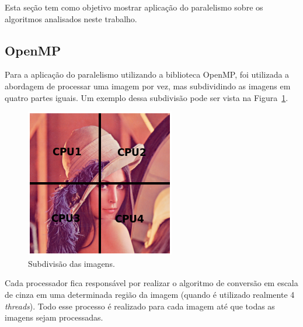 Esta seção tem como objetivo mostrar aplicação do paralelismo sobre os
algoritmos analisados neste trabalho.

\subsection{OpenMP}

Para a aplicação do paralelismo utilizando a biblioteca OpenMP, foi utilizada a
abordagem de processar uma imagem por vez, mas subdividindo as imagens em quatro
partes iguais. Um exemplo dessa subdivisão pode ser vista na
Figura~\ref{fig:lena}.

\begin{figure}[!h]
	\centering
	\includegraphics[width=0.3\linewidth]{figs/lenna.png}
	\caption{Subdivisão das imagens.}
	\label{fig:lena}
\end{figure}

Cada processador fica responsável por realizar o algoritmo de conversão em
escala de cinza em uma determinada região da imagem (quando é utilizado
realmente 4 \textit{threads}). Todo esse processo é realizado para cada imagem
até que todas as imagens sejam processadas.
 
